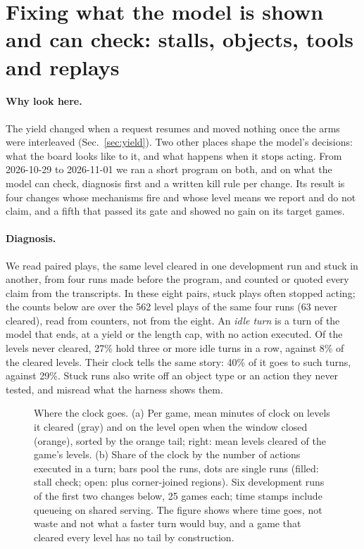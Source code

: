 \section{Fixing what the model is shown and can check: stalls, objects, tools and replays}\label{sec:harness}

\paragraph{Why look here.}
The yield changed when a request resumes and moved nothing once the arms were interleaved (Sec.~\ref{sec:yield}).
Two other places shape the model's decisions: what the board looks like to it, and what happens when it stops acting.
From 2026-10-29 to 2026-11-01 we ran a short program on both, and on what the model can check, diagnosis first and a written kill rule per change. %
Its result is four changes whose mechanisms fire and whose level means we report and do not claim, and a fifth that passed its gate and showed no gain on its target games.

\paragraph{Diagnosis.}
We read paired plays, the same level cleared in one development run and stuck in another, from four runs made before the program, and counted or quoted every claim from the transcripts. %
In these eight pairs, stuck plays often stopped acting; the counts below are over the 562 level plays of the same four runs (63 never cleared), read from counters, not from the eight. An \emph{idle turn} is a turn of the model that ends, at a yield or the length cap, with no action executed. %
Of the levels never cleared, 27\% hold three or more idle turns in a row, against 8\% of the cleared levels. %
Their clock tells the same story: 40\% of it goes to such turns, against 29\%. %
Stuck runs also write off an object type or an action they never tested, and misread what the harness shows them.

\begin{figure}[t]
\centering
{}
\caption{Where the clock goes. (a) Per game, mean minutes of clock on levels it cleared (gray) and on the level open when the window closed (orange), sorted by the orange tail; right: mean levels cleared of the game's levels. (b) Share of the clock by the number of actions executed in a turn; bars pool the runs, dots are single runs (filled: stall check; open: plus corner-joined regions). Six development runs of the first two changes below, 25 games each; time stamps include queueing on shared serving. The figure shows where time goes, not waste and not what a faster turn would buy, and a game that cleared every level has no tail by construction.}\label{fig:clock} %
\end{figure}

